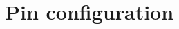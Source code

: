 \documentclass[12pt, a4paper]{extarticle}
\numberwithin{equation}{section}
\numberwithin{equation}{section}
\begin{document}
\tableofcontents

\section{Pin configuration}
\end{document}
